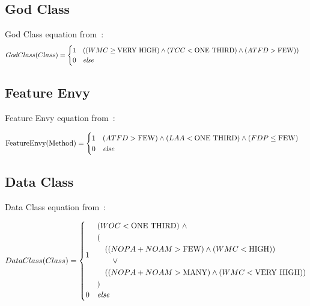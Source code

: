 \documentclass{article}
\begin{document}
\subsection{God Class}

God Class equation from~\cite{Lanza2006}:
\begin{equation}
GodClass(Class) = \begin{cases} 
                        1 & \!\begin{aligned} 
                          & {((WMC \geq \text{VERY HIGH}) \land (TCC < \text{ONE THIRD}) \land (ATFD > \text{FEW}))} 
                          \end{aligned} \\
                        0 & \text{\textit{else}} 
                  \end{cases} 
\label{eq:godclass}
\end{equation}

\subsection{Feature Envy}
Feature Envy equation from~\cite{Lanza2006}:

\begin{equation}
\text{FeatureEnvy(Method)} = 
    \begin{cases}
        1 & \!\begin{aligned}
                & (ATFD > \text{FEW}) \land (LAA < \text{ONE THIRD}) \land (FDP \leq \text{FEW}) 
            \end{aligned} \\ 
                        0 & \text{\textit{else}} 
        \end{cases} 
\label{eq:featureenvy}
\end{equation}

\subsection{Data Class}
Data Class equation from~\cite{Lanza2006}:

\begin{equation}
DataClass(Class) = \begin{cases} 
                        1 & \!\begin{aligned} 
                                & (WOC < \text{ONE THIRD})~\land \\ 
                                & ( \\
                                & \quad  ((NOPA + NOAM > \text{FEW}) \land (WMC < \text{HIGH})) \\
                                & \quad \quad \lor \\ 
                                & \quad ((NOPA + NOAM > \text{MANY}) \land (WMC < \text{VERY HIGH})) \\
                                & )
                                \end{aligned} \\
                        0 & \text{\textit{else}} \\
                    \end{cases} 
\label{eq:dataclass}
\end{equation}
\end{document}
